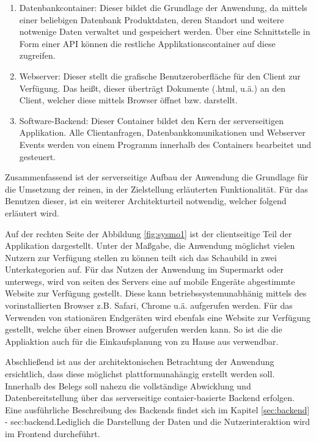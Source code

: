 \begin{enumerate}[leftmargin=*]
\item Datenbankcontainer: Dieser bildet die Grundlage der Anwendung, da mittels einer beliebigen Datenbank Produktdaten, deren Standort
      und weitere notwenige Daten verwaltet und gespeichert werden. Über eine Schnittstelle in Form einer \ac{API} können die restliche 
      Applikationscontainer auf diese zugreifen.

\item Webserver: Dieser stellt die grafische Benutzeroberfläche für den Client zur Verfügung. Das heißt, dieser überträgt Dokumente (.html, u.ä.)
      an den Client, welcher diese mittels Browser öffnet bzw. darstellt.

\item Software-Backend: Dieser Container bildet den Kern der serverseitigen Applikation. Alle Clientanfragen, Datenbankkomunikationen
      und Webserver Events werden von einem Programm innerhalb des Containers bearbeitet und gesteuert.      
\end{enumerate}

Zusammenfassend ist der serverseitige Aufbau der Anwendung die Grundlage für die Umsetzung der reinen, in der Zielstellung erläuterten 
Funktionalität. Für das Benutzen dieser, ist ein weiterer Architekturteil notwendig, welcher folgend erläutert wird.

Auf der rechten Seite der Abbildung \ref{fig:sysmo1} ist der clientseitige Teil der Applikation dargestellt. Unter der Maßgabe, 
die Anwendung möglichst vielen Nutzern zur Verfügung stellen zu können teilt sich das Schaubild in zwei Unterkategorien auf. 
Für das Nutzen der Anwendung im Supermarkt oder unterwegs, wird von seiten des Servers eine auf mobile Engeräte abgestimmte Website 
zur Verfügung gestellt. Diese kann betriebssystemunabhänig mittels des vorinstallierten Browser z.B. Safari, Chrome u.ä. aufgerufen werden.
Für das Verwenden von stationären Endgeräten wird ebenfals eine Website zur Verfügung gestellt, welche über einen Browser aufgerufen werden kann.
So ist die die Appliaktion auch für die Einkaufsplanung von zu Hause aus verwendbar. 


Abschließend ist aus der architektonischen Betrachtung der Anwendung ersichtlich, dass diese möglichst plattformunahängig erstellt werden soll.
Innerhalb des Belegs soll nahezu die vollständige Abwicklung und Datenbereitstellung über das serverseitige contaier-basierte Backend erfolgen.
Eine ausführliche Beschreibung des Backends findet sich im Kapitel \ref{sec:backend} - \refname{sec:backend}.Lediglich die Darstellung der Daten 
und die Nutzerinteraktion wird im Frontend durcheführt.

